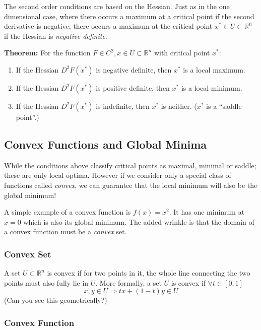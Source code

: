 \documentclass[11pt,]{article}
\providecommand{\tightlist}{%
  \setlength{\itemsep}{0pt}\setlength{\parskip}{0pt}}
\begin{document}
The second order conditions are based on the Hessian. Just as in the one
dimensional case, where there occurs a maximum at a critical point if
the second derivative is negative; there occurs a maximum at the
critical point \(x^*\in U\subset \mathbb{R}^n\) if the Hessian is
\emph{negative definite}.

\textbf{Theorem:} For the function
\(F\in C^2, x\in U\subset \mathbb{R}^n\) with critical point \(x^*\):

\begin{enumerate}
\def\labelenumi{\arabic{enumi}.}
\tightlist
\item
  If the Hessian \(D^2F(x^*)\) is negative definite, then \(x^*\) is a
  local maximum.
\item
  If the Hessian \(D^2F(x^*)\) is positive definite, then \(x^*\) is a
  local minimum.
\item
  If the Hessian \(D^2F(x^*)\) is indefinite, then \(x^*\) is neither.
  (\(x^*\) is a ``saddle point''.)
\end{enumerate}

\subsection{Convex Functions and Global
Minima}\label{convex-functions-and-global-minima}

While the conditions above classify critical points as maximal, minimal
or saddle; these are only local optima. However if we consider only a
special class of functions called \emph{convex}, we can guarantee that
the local minimum will also be the global minimum!

A simple example of a convex function is \(f(x) = x^2\). It has one
minimum at \(x=0\) which is also its global minimum. The added wrinkle
is that the domain of a convex function must be a \emph{convex} set.

\subsubsection{Convex Set}\label{convex-set}

A set \(U\subset \mathbb{R}^n\) is convex if for two points in it, the
whole line connecting the two points must also fully lie in \(U\). More
formally, a set \(U\) is convex if \(\forall t\in[0,1]\) \[
x, y \in U \Rightarrow tx+(1-t)y\in U
\] (Can you see this geometrically?)

\subsubsection{Convex Function}\label{convex-function}
\end{document}
